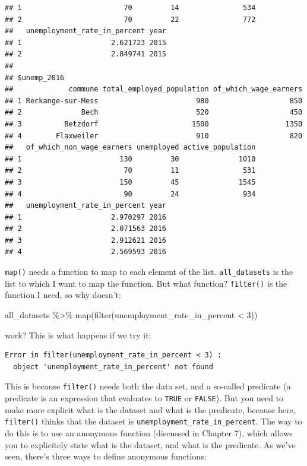 \documentclass[
]{article}
\newenvironment{Shaded}{\begin{snugshade}}{\end{snugshade}}
\newcommand{\DecValTok}[1]{\textcolor[rgb]{0.00,0.00,0.81}{#1}}
\newcommand{\FunctionTok}[1]{\textcolor[rgb]{0.00,0.00,0.00}{#1}}
\newcommand{\NormalTok}[1]{#1}
\newcommand{\SpecialCharTok}[1]{\textcolor[rgb]{0.00,0.00,0.00}{#1}}
\begin{document}
\begin{verbatim}
## 1                        70         14               534
## 2                        70         22               772
##   unemployment_rate_in_percent year
## 1                     2.621723 2015
## 2                     2.849741 2015
## 
## $unemp_2016
##             commune total_employed_population of_which_wage_earners
## 1 Reckange-sur-Mess                       980                   850
## 2              Bech                       520                   450
## 3          Betzdorf                      1500                  1350
## 4        Flaxweiler                       910                   820
##   of_which_non_wage_earners unemployed active_population
## 1                       130         30              1010
## 2                        70         11               531
## 3                       150         45              1545
## 4                        90         24               934
##   unemployment_rate_in_percent year
## 1                     2.970297 2016
## 2                     2.071563 2016
## 3                     2.912621 2016
## 4                     2.569593 2016
\end{verbatim}

\texttt{map()} needs a function to map to each element of the list. \texttt{all\_datasets} is the list to which I
want to map the function. But what function? \texttt{filter()} is the function I need, so why doesn't:

\begin{Shaded}
\begin{Highlighting}[]
\NormalTok{all\_datasets }\SpecialCharTok{\%\textgreater{}\%}
  \FunctionTok{map}\NormalTok{(}\FunctionTok{filter}\NormalTok{(unemployment\_rate\_in\_percent }\SpecialCharTok{\textless{}} \DecValTok{3}\NormalTok{))}
\end{Highlighting}
\end{Shaded}

work? This is what happens if we try it:

\begin{verbatim}
Error in filter(unemployment_rate_in_percent < 3) :
  object 'unemployment_rate_in_percent' not found
\end{verbatim}

This is because \texttt{filter()} needs both the data set, and a so-called predicate (a predicate
is an expression that evaluates to \texttt{TRUE} or \texttt{FALSE}). But you need to make more explicit
what is the dataset and what is the predicate, because here, \texttt{filter()} thinks that the
dataset is \texttt{unemployment\_rate\_in\_percent}. The way to do this is to use an anonymous
function (discussed in Chapter 7), which allows you to explicitely state what is the
dataset, and what is the predicate. As we've seen, there's three ways to define
anonymous functions:
\end{document}
